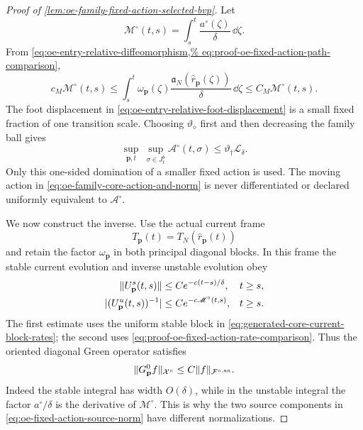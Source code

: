 \begin{proof}[Proof of
\cref{lem:oe-family-fixed-action-selected-bvp}]
Let
\[
 \mathscr M^\circ(t,s)
 =\int_s^t\frac{a^\circ(\zeta)}{\delta}\,\dd\zeta .
\]
From
\cref{eq:oe-entry-relative-diffeomorphism,%
eq:proof-oe-fixed-action-path-comparison},
\begin{equation}
 c_M\mathscr M^\circ(t,s)
 \le\int_s^t\omega_{\mathbf p}(\zeta)
       \frac{\mathfrak a_N(\widehat r_{\mathbf p}(\zeta))}
            {\delta}\,\dd\zeta
 \le C_M\mathscr M^\circ(t,s).                 \label{eq:proof-oe-fixed-action-rate-comparison}
\end{equation}
The foot displacement in
\cref{eq:oe-entry-relative-foot-displacement} is a small fixed fraction
of one transition scale.  Choosing
\(\vartheta_\diamond\) first and then decreasing the family ball gives
\begin{equation}
 \sup_{\mathbf p,t}\ \sup_{\sigma\in J_t^b}
 \mathscr A^\circ(t,\sigma)
 \le\vartheta_\dagger\mathscr L_\delta.         \label{eq:proof-oe-fixed-action-foot-envelope}
\end{equation}
Only this one-sided domination of a smaller fixed action is used.  The
moving action in
\cref{eq:oe-family-core-action-and-norm} is never differentiated or
declared uniformly equivalent to \(\mathscr A^\circ\).

We now construct the inverse.  Use the actual current frame
\[
 T_{\mathbf p}(t)=T_N(\widehat r_{\mathbf p}(t))
\]
and retain the factor \(\omega_{\mathbf p}\) in both principal diagonal
blocks.  In this frame the stable current evolution and inverse
unstable evolution obey
\begin{align}
 \|U_{\mathbf p}^s(t,s)\|
 &\le Ce^{-c(t-s)/\delta},&&t\ge s,\notag\\
 |(U_{\mathbf p}^u(t,s))^{-1}|
 &\le Ce^{-c\mathscr M^\circ(t,s)},&&t\ge s.   \label{eq:proof-oe-fixed-action-diagonal-evolution}
\end{align}
The first estimate uses the uniform stable block in
\cref{eq:generated-core-current-block-rates}; the second uses
\cref{eq:proof-oe-fixed-action-rate-comparison}.  Thus the oriented
diagonal Green operator satisfies
\begin{equation}
 \|G_{\mathbf p}^0f\|_{\mathcal X^\circ}
 \le C\|f\|_{\mathcal F^{\circ,\rm an}}.        \label{eq:proof-oe-fixed-action-diagonal-green}
\end{equation}
Indeed the stable integral has width \(O(\delta)\), while in the
unstable integral the factor \(a^\circ/\delta\) is the derivative of
\(\mathscr M^\circ\).  This is why the two source components in
\cref{eq:oe-fixed-action-source-norm} have different normalizations.


\end{proof}
